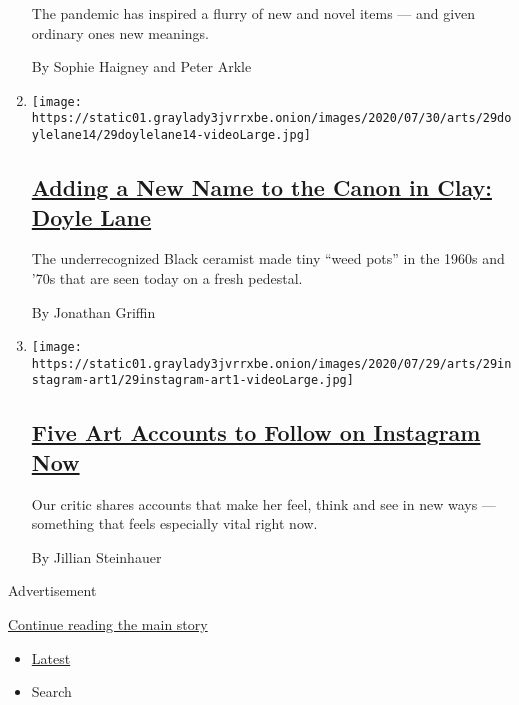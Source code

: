 \begin{enumerate}
  The pandemic has inspired a flurry of new and novel items --- and
  given ordinary ones new meanings.

  By Sophie Haigney and Peter Arkle
\item
  \texttt{[image: https://static01.graylady3jvrrxbe.onion/images/2020/07/30/arts/29doylelane14/29doylelane14-videoLarge.jpg]}

  \hypertarget{adding-a-new-name-to-the-canon-in-clay-doyle-lane}{%
  \subsection{\texorpdfstring{\href{/2020/07/29/arts/design/doyle-lane-ceramics.html}{Adding
  a New Name to the Canon in Clay: Doyle
  Lane}}{Adding a New Name to the Canon in Clay: Doyle Lane}}\label{adding-a-new-name-to-the-canon-in-clay-doyle-lane}}

  The underrecognized Black ceramist made tiny ``weed pots'' in the
  1960s and '70s that are seen today on a fresh pedestal.

  By Jonathan Griffin
\item
  \texttt{[image: https://static01.graylady3jvrrxbe.onion/images/2020/07/29/arts/29instagram-art1/29instagram-art1-videoLarge.jpg]}

  \hypertarget{five-art-accounts-to-follow-on-instagram-now}{%
  \subsection{\texorpdfstring{\href{/2020/07/29/arts/design/art-accounts-to-follow-instagram.html}{Five
  Art Accounts to Follow on Instagram
  Now}}{Five Art Accounts to Follow on Instagram Now}}\label{five-art-accounts-to-follow-on-instagram-now}}

  Our critic shares accounts that make her feel, think and see in new
  ways --- something that feels especially vital right now.

  By Jillian Steinhauer
\end{enumerate}

Advertisement

\protect\hyperlink{after-mid1}{Continue reading the main story}

\begin{itemize}
\tightlist
\item
  \protect\hyperlink{stream-panel}{Latest}
\item
  Search
\end{itemize}


